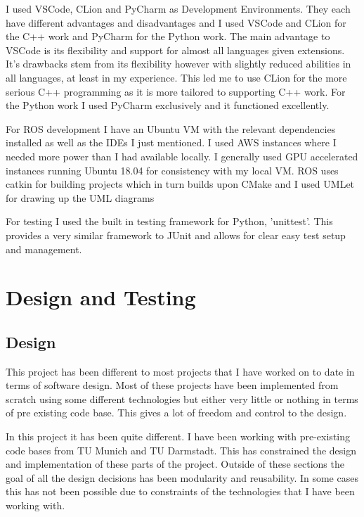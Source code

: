 \documentclass[]{../resources/final_report}
\begin{document}
I used VSCode, CLion and PyCharm as Development Environments. They each have different advantages and disadvantages and I used VSCode and CLion for the C++ work and PyCharm for the Python work. The main advantage to VSCode is its flexibility and support for almost all languages given extensions. It's drawbacks stem from its flexibility however with slightly reduced abilities in all languages, at least in my experience. This led me to use CLion for the more serious C++ programming as it is more tailored to supporting C++ work. For the Python work I used PyCharm exclusively and it functioned excellently.

For ROS development I have an Ubuntu VM with the relevant dependencies installed as well as the IDEs I just mentioned. I used AWS instances where I needed more power than I had available locally. I generally used GPU accelerated instances running Ubuntu 18.04 for consistency with my local VM. ROS uses catkin for building projects which in turn builds upon CMake and I used UMLet for drawing up the UML diagrams 

For testing I used the built in testing framework for Python, 'unittest'. This provides a very similar framework to JUnit and allows for clear easy test setup and management.


\section{Design and Testing}

\subsection{Design}

This project has been different to most projects that I have worked on to date in terms of software design. Most of these projects have been implemented from scratch using some different technologies but either very little or nothing in terms of pre existing code base. This gives a lot of freedom and control to the design.

In this project it has been quite different. I have been working with pre-existing code bases from TU Munich and TU Darmstadt. This has constrained the design and implementation of these parts of the project. Outside of these sections the goal of all the design decisions has been modularity and reusability. In some cases this has not been possible due to constraints of the technologies that I have been working with.
\end{document}
